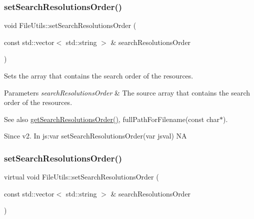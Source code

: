 \subsubsection{\texorpdfstring{set\+Search\+Resolutions\+Order()}{setSearchResolutionsOrder()}\hspace{0.1cm}{\footnotesize\ttfamily [1/2]}}
{\footnotesize\ttfamily void File\+Utils\+::set\+Search\+Resolutions\+Order (\begin{DoxyParamCaption}\item[{const std\+::vector$<$ std\+::string $>$ \&}]{search\+Resolutions\+Order }\end{DoxyParamCaption})\hspace{0.3cm}{\ttfamily [virtual]}}

Sets the array that contains the search order of the resources.


\begin{DoxyParams}{Parameters}
{\em search\+Resolutions\+Order} & The source array that contains the search order of the resources. \\
\hline
\end{DoxyParams}
\begin{DoxySeeAlso}{See also}
\hyperlink{classFileUtils_a079329ce5d4a0154fed6a3987d42dc26}{get\+Search\+Resolutions\+Order()}, full\+Path\+For\+Filename(const char$\ast$). 
\end{DoxySeeAlso}
\begin{DoxySince}{Since}
v2. In js\+:var set\+Search\+Resolutions\+Order(var jsval)  NA 
\end{DoxySince}
\mbox{\label{classFileUtils_ae9c17f012420d7acc993503c5596bf7f}} 
\subsubsection{\texorpdfstring{set\+Search\+Resolutions\+Order()}{setSearchResolutionsOrder()}\hspace{0.1cm}{\footnotesize\ttfamily [2/2]}}
{\footnotesize\ttfamily virtual void File\+Utils\+::set\+Search\+Resolutions\+Order (\begin{DoxyParamCaption}\item[{const std\+::vector$<$ std\+::string $>$ \&}]{search\+Resolutions\+Order }\end{DoxyParamCaption})\hspace{0.3cm}{\ttfamily [virtual]}}

